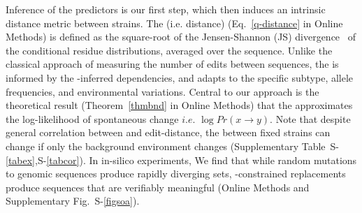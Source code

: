 \documentclass[onecolumn, compsoc,10pt]{IEEEtran}
\def\SUPPLEMENTARY{Supplementary\xspace}
\def\METHODS{Online Methods\xspace}
\begin{document}
Inference of the \enet predictors is our first step, which then induces  an intrinsic distance metric between strains. The \qdist (i.e. \enet distance) (Eq.~\eqref{q-distance} in \METHODS) is defined as the square-root of the Jensen-Shannon (JS) divergence~\cite{cover} of the conditional residue distributions, averaged over the sequence. Unlike the classical approach of measuring the number of edits between sequences, the \qdist is informed by the \enet-inferred  dependencies, and adapts to the specific subtype, allele frequencies, and environmental variations. Central to our approach is the theoretical result (Theorem~\ref{thmbnd} in \METHODS) that the \qdist  approximates the log-likelihood of spontaneous change $i.e.$ $\log Pr(x \rightarrow y )$. Note that despite general correlation between \qdist and edit-distance, the \qdist between fixed strains can change if only the background environment changes (\SUPPLEMENTARY Table~S-\ref{tabex},S-\ref{tabcor}).  In in-silico experiments, We find that while random mutations to genomic sequences produce rapidly diverging sets, \enet-constrained replacements produce sequences that are verifiably meaningful (\METHODS and \SUPPLEMENTARY Fig.~S-\ref{figsoa}).


\end{document}
